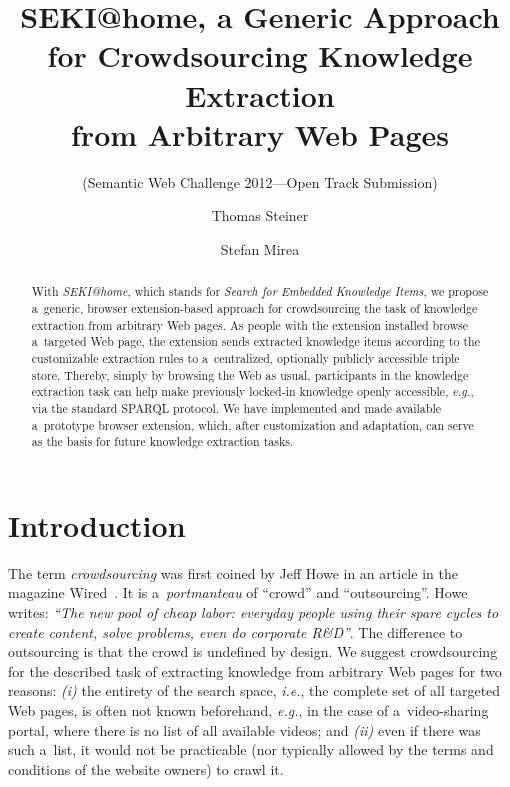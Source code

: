 \documentclass[runningheads,a4paper]{llncs}
\begin{document}
\title{SEKI@home, a Generic Approach for Crowdsourcing Knowledge Extraction \\ from Arbitrary Web Pages}

\subtitle{(Semantic Web Challenge 2012---Open Track Submission)}


\author{
  Thomas Steiner \and
  Stefan Mirea
}


\maketitle
\setcounter{footnote}{0}

\begin{abstract}
With \emph{SEKI@home}, which stands for \emph{Search for Embedded Knowledge Items},
we propose a~generic, browser extension-based approach
for crowdsourcing the task of knowledge extraction from arbitrary Web pages.
As people with the extension installed browse a~targeted Web page,
the extension sends extracted knowledge items
according to the customizable extraction rules
to a~centralized, optionally publicly accessible triple store.
Thereby, simply by browsing the Web as usual,
participants in the knowledge extraction task can help
make previously locked-in knowledge openly accessible,
\emph{e.g.}, via the standard SPARQL protocol.
We have implemented and made available a~prototype browser extension,
which, after customization and adaptation,
can serve as the basis for future knowledge extraction tasks.
\end{abstract}

\section{Introduction}
The term \emph{crowdsourcing} was first coined by Jeff Howe
in an article in the magazine Wired~\cite{howe2006}.
It is a~\textit{portmanteau} of ``crowd'' and ``outsourcing''.
Howe writes: \textit{``The new pool of cheap labor:
everyday people using their spare cycles to create content, solve problems,
even do corporate R\&D''}.
The difference to outsourcing is that the crowd is undefined by design.
We suggest crowdsourcing for the described task of extracting knowledge from
arbitrary Web pages for two reasons:
\textit{(i)} the entirety of the search space, \emph{i.e.},
the complete set of all targeted Web pages, is often not known beforehand,
\emph{e.g.}, in the case of a~video-sharing portal,
where there is no list of all available videos; and
\textit{(ii)} even if there was such a~list,
it would not be practicable (nor typically allowed by the terms and conditions of the website owners) to crawl it.
\end{document}

